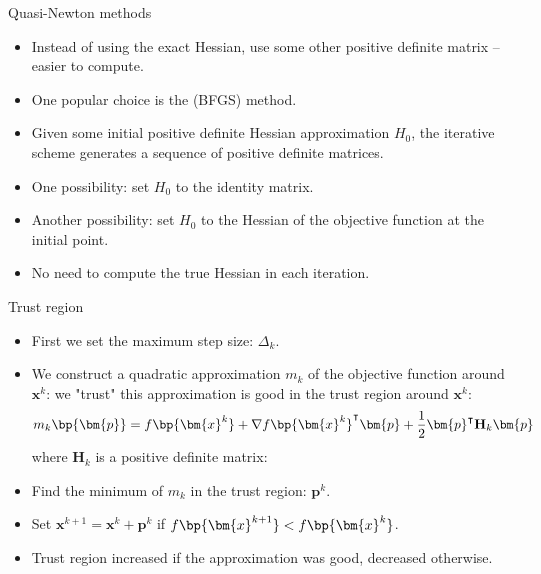 \documentclass[11pt,xcolor={dvipsnames},aspectratio=159,hyperref={pdftex,pdfpagemode=UseNone,hidelinks,pdfdisplaydoctitle=true},usepdftitle=false]{beamer}
\begin{document}
    \begin{frame}{Quasi-Newton methods}
        \begin{itemize}
            \item Instead of using the exact Hessian, use some other  positive definite matrix -- easier to compute.
            \item One popular choice is the  (BFGS) method.
            \item Given some initial positive definite Hessian approximation $H_0$, the iterative scheme generates a sequence of positive definite matrices.
            \item One possibility: set $H_0$ to the identity matrix.
            \item Another possibility: set $H_0$ to the Hessian of the objective function at the initial point.
            \item No need to compute the true Hessian in each iteration.
            \end{itemize}
    \end{frame} 
    
    \begin{frame}{Trust region}
        \begin{itemize}
            \item First we set the maximum step size:  $\Delta_k$.
            \item We construct a quadratic approximation $m_k$ of the objective function around $\bm{x}^k$: we "trust" this approximation is good in the trust region around $\bm{x}^k$:
            $$m_k\bp{\bm{p}} = f\bp{\bm{x}^k} + \nabla f\bp{\bm{x}^k}^\intercal \bm{p} + \frac{1}{2} \bm{p}^\intercal \mathbf{H}_k \bm{p}$$ where $\mathbf{H}_k$ is a positive definite matrix:
            \item Find the minimum of $m_k$ in the trust region: $\bm{p}^k$.
            \item Set $\bm{x}^{k+1} = \bm{x}^k + \bm{p}^k$ if $f\bp{\bm{x}^{k+1}}<f\bp{\bm{x}^k}$.
            \item Trust region increased if the approximation was good, decreased otherwise.
            \end{itemize}
        \end{frame}   
\end{document}
